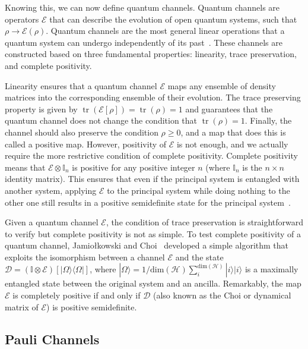 \documentclass[10pt,letterpaper]{article} %
\DeclareMathOperator{\tr}{tr}
\begin{document}
Knowing this, we can now define quantum channels.  Quantum channels are
operators $\mathcal{E}$ that can describe the evolution of open quantum
systems, such that $\rho \rightarrow \mathcal{E}(\rho)$.  Quantum channels are
the most general linear operations that a quantum system can undergo
independently of its past~\cite{zimansbook,cirac}.  These channels are
constructed based on three fundamental properties: linearity, trace
preservation, and complete positivity.

Linearity ensures that a quantum channel $\mathcal{E}$ maps any ensemble of
density matrices into the corresponding ensemble of their evolution.  The trace
preserving property is given by $\tr (\mathcal{E}[\rho]) = \tr (\rho) = 1$ and
guarantees that the quantum channel does not change the condition that
$\tr(\rho) = 1$.  Finally, the channel should also preserve the condition $\rho
\geq 0$, and a map that does this is called a positive map.  However,
positivity of $\mathcal{E}$ is not enough, and we actually require the more
restrictive condition of complete positivity.  Complete positivity means that
$\mathcal{E} \otimes \mathbb{I}_n$ is positive for any positive integer $n$
(where $\mathbb{I}_n$ is the $n\times n$ identity matrix).  This ensures that
even if the principal system is entangled with another system, applying
$\mathcal{E}$ to the principal system while doing nothing to the other one
still results in  a positive semidefinite state for the principal
system~\cite{chuangbook}. 

Given a quantum channel $\mathcal{E}$, the condition of trace preservation is
straightforward to verify but complete positivity is not as simple.  To test
complete positivity of a quantum channel, Jamiołkowski and
Choi~\cite{choi,jamil} developed a simple algorithm that exploits the
isomorphism between a channel $\mathcal{E}$ and the state $\mathcal{D} =
(\mathbb{I} \otimes \mathcal{E}) [|\Omega \rangle \langle  \Omega|]$, where
$|\Omega\rangle = 1/\text{dim}(\mathcal{H}) \sum_{i}^{\text{dim}(\mathcal{H})}
|i \rangle |i \rangle$ is a maximally entangled state between the original
system and an ancilla.  Remarkably, the map $\mathcal{E}$ is completely
positive if and only if $\mathcal{D}$ (also known as the Choi or dynamical
matrix of $\mathcal{E}$) is positive semidefinite.

\subsection{Pauli Channels}  \label{subsec: Pauli Channels} %
\end{document}
